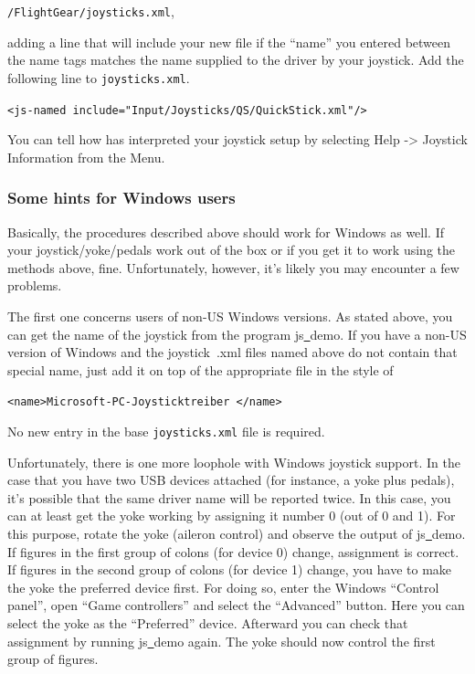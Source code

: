 {\noindent
 \texttt{/FlightGear/joysticks.xml},


\noindent
adding a line that will include your new file if the ``name'' you entered between the name tags matches the name supplied to the driver by your joystick.  Add the following line to \texttt{joysticks.xml}.
\medskip

\noindent
	\texttt{<js-named include="Input/Joysticks/QS/QuickStick.xml"/>}
\medskip

You can tell how \FlightGear{} has interpreted your joystick setup by selecting
Help -> Joystick Information from the Menu.

\subsubsection{Some hints for Windows users\label{joyxp}}
Basically, the procedures described above should work for Windows as well. If your joystick/yoke/pedals work out of the box or if you get it to work using the methods above, fine. Unfortunately, however, it's likely you may encounter a few problems.

The first one concerns users of non-US Windows versions. As stated above, you can get the name of the joystick from the program js\underline{~}demo. If you have a non-US version of Windows and the joystick~.xml files named above do not contain that special name, just add it on top of the appropriate file in the style of
\medskip

 \texttt{<name>Microsoft-PC-Joysticktreiber </name>}
 \medskip

\noindent
No new entry in the base \texttt{joysticks.xml} file is required.

Unfortunately, there is one more loophole with Windows joystick support. In the case that you have two USB devices attached (for instance, a yoke plus pedals), it's possible that the same driver name will be reported twice. In this
case, you can at least get the yoke working by assigning it number 0 (out of
0 and 1). For this purpose, rotate the yoke (aileron control) and observe
the output of js\underline{~}demo. If figures in the first group of colons
(for device 0) change, assignment is correct. If figures in the second group
of colons (for device 1) change, you have to make the yoke the preferred
device first. For doing so, enter the
Windows ``Control panel'', open ``Game controllers'' and select the
``Advanced'' button. Here you can select the yoke as the ``Preferred''
device. Afterward you can check that assignment by running
js\underline{~}demo again. The yoke should now control the first group of
figures.

}

